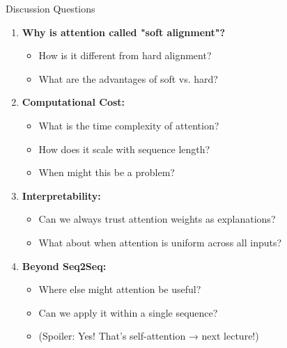 \documentclass[aspectratio=169]{beamer}
\begin{document}
\begin{frame}[shrink=10]{Discussion Questions 💭}
\begin{enumerate}\setlength{\itemsep}{0pt}
    \item \textbf{Why is attention called "soft alignment"?}
    \begin{itemize}\setlength{\itemsep}{0pt}
        \item How is it different from hard alignment?
        \item What are the advantages of soft vs. hard?
    \end{itemize}

    \vspace{0.5em}

    \item \textbf{Computational Cost:}
    \begin{itemize}\setlength{\itemsep}{0pt}
        \item What is the time complexity of attention?
        \item How does it scale with sequence length?
        \item When might this be a problem?
    \end{itemize}

    \vspace{0.5em}

    \item \textbf{Interpretability:}
    \begin{itemize}\setlength{\itemsep}{0pt}
        \item Can we always trust attention weights as explanations?
        \item What about when attention is uniform across all inputs?
    \end{itemize}

    \vspace{0.5em}

    \item \textbf{Beyond Seq2Seq:}
    \begin{itemize}\setlength{\itemsep}{0pt}
        \item Where else might attention be useful?
        \item Can we apply it within a single sequence?
        \item (Spoiler: Yes! That's self-attention → next lecture!)
    \end{itemize}
\end{enumerate}
\end{frame}
\end{document}
